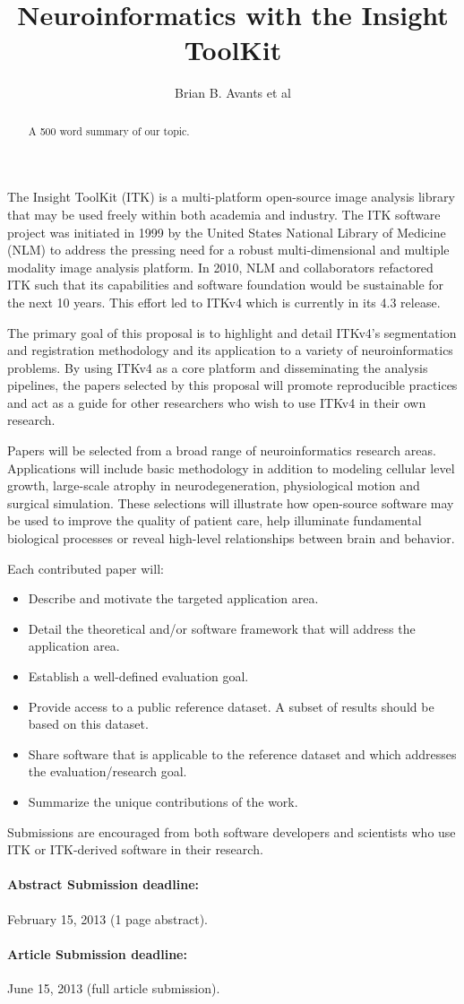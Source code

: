\documentclass{article}
\begin{document}
\title{Neuroinformatics with the Insight ToolKit}
\author{Brian B. Avants et al}
\maketitle
\begin{abstract}
A 500 word summary of our topic. 
\end{abstract}
The Insight ToolKit (ITK) is a multi-platform open-source image analysis library that may be used freely within both academia and industry.  The ITK software project was initiated in 1999 by the United States National Library of Medicine (NLM) to address the pressing need for a robust multi-dimensional and multiple modality image analysis platform.  In 2010, NLM and collaborators refactored ITK such that its capabilities and software foundation would be sustainable for the next 10 years.  This effort led to ITKv4 which is currently in its 4.3 release.  

The primary goal of this proposal is to highlight and detail ITKv4's segmentation and registration methodology and its application to a variety of neuroinformatics problems.  By using ITKv4 as a core platform and disseminating the analysis pipelines, the papers selected by this proposal will promote reproducible practices and act as a guide for other researchers who wish to use ITKv4 in their own research.  

Papers will be selected from a broad range of neuroinformatics research areas.  Applications will include basic methodology in addition to modeling cellular level growth, large-scale atrophy in neurodegeneration, physiological motion and surgical simulation.  These selections will illustrate how open-source software may be used to improve the quality of patient care, help illuminate fundamental biological processes or reveal high-level relationships between brain and behavior.  

Each contributed paper will:
\begin{itemize}
\item  Describe and motivate the targeted application area.
\item  Detail the theoretical and/or software framework that will address the application area.
\item  Establish a well-defined evaluation goal. 
\item  Provide access to a public reference dataset.  A subset of results should be based on this dataset.
\item  Share software that is applicable to the reference dataset and which addresses the evaluation/research goal.  
\item  Summarize the unique contributions of the work.  
\end{itemize}
Submissions are encouraged from both software developers and scientists who use ITK or ITK-derived software in their research.

\paragraph{Abstract Submission deadline:} February 15, 2013 (1 page abstract). 

\paragraph{Article Submission deadline:} June 15, 2013 (full article submission).
\end{document}
